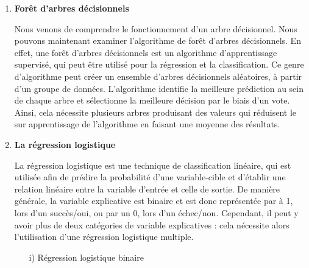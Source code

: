 \documentclass[12pt,a4paper,openay]{book}
\numberwithin{equation}{chapter}
\begin{document}
\begin{enumerate}
	  L'algorithme pour les mod\`eles des K plus proches voisins est le suivant :
	  
	  \begin{itemize}
	       \item  Choisir le nombre K de voisins
	  	  \item Calculer la distance Euclidienne des K voisins
	  	  
	  	  \item Prendre les K plus proches voisins, d\'ependant du r\'esultat du calcul de la distance
	  	  
	  	  \item Parmi ce K voisin, compter le nombre de points dans chaque classe
	  	  
	  	  \item Attribuer le nouveau point \`a la classe dont le nombre de voisins est maximal
	  	  
	  	  \item Le mod\`ele est termin\'e
	  \end{itemize}
	  
	  
	  \item \textbf{For\^et d'arbres d\'ecisionnels}
	  
	  Nous venons de comprendre le fonctionnement d'un arbre d\'ecisionnel. Nous pouvons maintenant examiner l'algorithme de for\^et d'arbres d\'ecisionnels. En effet, une for\^et d'arbres d\'ecisionnels est un algorithme d'apprentissage supervis\'e, qui peut \^etre utilis\'e pour la r\'egression et la classification. Ce genre d'algorithme peut cr\'eer un ensemble d'arbres d\'ecisionnels al\'eatoires, \`a partir d'un groupe de donn\'ees. L'algorithme identifie la meilleure pr\'ediction au sein de chaque arbre et s\'electionne la meilleure d\'ecision par le biais d'un vote. Ainsi, cela n\'ecessite plusieurs arbres produisant des valeurs qui r\'eduisent le sur apprentissage de l'algorithme en faisant une moyenne des r\'esultats.
	  
	  \item \textbf{La r\'egression logistique}
	  
	  La r\'egression logistique est une technique de classification lin\'eaire, qui est utilis\'ee afin de pr\'edire la probabilit\'e d'une variable-cible et d'\'etablir une relation lin\'eaire entre la variable d'entr\'ee et celle de sortie. De mani\`ere g\'en\'erale, la variable explicative est binaire et est donc repr\'esent\'ee par \`a 1, lors d'un succ\`es/oui, ou par un 0, lors d'un \'echec/non. Cependant, il peut y avoir plus de deux cat\'egories de variable explicatives : cela n\'ecessite alors l'utilisation d'une r\'egression logistique multiple.	  
	\begin{itemize}
		\item[i)] R\'egression logistique binaire
	  	  

\end{itemize}
\end{enumerate}
\end{document}
